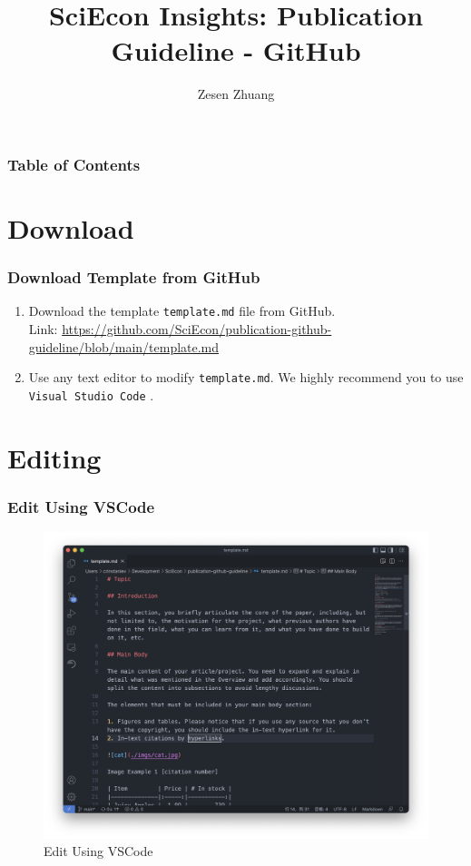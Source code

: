 \documentclass{beamer}
\title{SciEcon Insights: Publication Guideline - GitHub}
\author{Zesen Zhuang \inst{1}}
\institute{\inst{1} SciEcon CIC}
\begin{document}
\maketitle

\begin{frame}

	\frametitle{Table of Contents}
	\tableofcontents

\end{frame}

\section{Download}
\begin{frame}
	
	\frametitle{Download Template from GitHub}
	
	\begin{enumerate}
		\item Download the template \texttt{template.md} file from GitHub.\\ 
		Link: \url{https://github.com/SciEcon/publication-github-guideline/blob/main/template.md}
	\item Use any text editor to modify \texttt{template.md}. We highly recommend you to use \texttt{Visual Studio Code} \cite{noauthor_visual_nodate}.
	\end{enumerate}
\end{frame}

\section{Editing}

\begin{frame}
\frametitle{Edit Using VSCode}
\begin{figure}[!htbp]
	\centering
	\includegraphics[width=.6\textwidth]{img/vscode.png}
	\caption{Edit Using VSCode}
\end{figure}
\end{frame}
\end{document}
